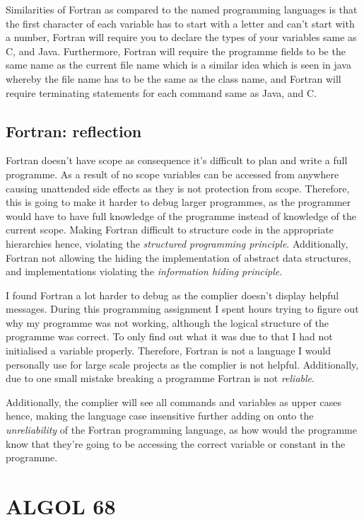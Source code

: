 \documentclass[
	12pt, %
]{fphw}
\begin{document}
Similarities of Fortran as compared to the named programming languages is that
the first character of each variable has to start with a letter and can't start
with a number, Fortran will require you to declare the types of your variables
same as C, and Java. Furthermore, Fortran will require the programme fields to be
the same name as the current file name which is a similar idea which is seen in
java whereby the file name has to be the same as the class name, and Fortran will
require terminating statements for each command same as Java, and C.

\subsection{Fortran: reflection}
Fortran doesn't have scope as consequence it's difficult to plan and write
a full programme. As a result of no scope variables can be accessed from anywhere
causing unattended side effects as they is not protection from scope. Therefore,
this is going to make it harder to debug larger programmes, as the
programmer would have to have full knowledge of the programme instead
of knowledge of the current scope. Making Fortran difficult to structure code
in the appropriate hierarchies hence, violating the \emph{structured programming principle}.
Additionally, Fortran not allowing the hiding the implementation of abstract data
structures, and implementations violating the \emph{information hiding
principle}.\par


I found Fortran a lot harder to debug as the complier doesn't display helpful
messages. During this programming assignment I spent hours trying to figure
out why my programme was not working, although the logical structure of the
programme was correct. To only find out what it was due to that I had not
initialised a variable properly. Therefore, Fortran is not a language I would
personally use for large scale projects as the complier is not helpful. Additionally,
due to one small mistake breaking a programme Fortran is not \emph{reliable}.\par


Additionally, the complier will see all commands and variables as upper cases hence, making the language
case insensitive further adding on onto the \emph{unreliability} of the Fortran
programming language, as how would the programme know that they're going to be
accessing the correct variable or constant in the programme.\par
\section{ALGOL 68}
\end{document}
